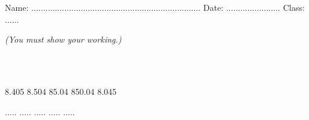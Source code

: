 \documentclass{article}
\date{}
\begin{document}
\fontsize{13}{15} \selectfont %

\begin{center}
  \qquad \\ 
\end{center} \\ 

Name: ........................................................................ \hspace{0.5cm}  Date: ....................... \hspace{0.5cm}  Class: ......

\par
\vspace*{10pt} 
\textit{(You must show your working.)  }
\vspace{10pt}

\hline
\vspace{10pt}

\par
{} \\
\vspace*{20pt}
\par

\begin{flushright}
\end{flushright}
 \vspace{10pt}

\hline
\vspace{10pt}

\par
{} \\

8.405 \hspace{3cm} 8.504  \hspace{3cm} 85.04 \hspace{3cm} 850.04 \hspace{3cm} 8.045 
\vspace{30pt}

 ..... \hspace{3cm} ..... \hspace{3cm}  ..... \hspace{3cm} ..... \hspace{3cm} .....  

\par
{} 
\vspace{10pt}
\end{document}
